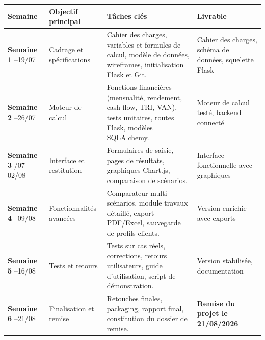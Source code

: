 \documentclass[11pt,a4paper]{article}
\begin{document}
	\begin{table}[H]
		\centering
		\footnotesize
		\renewcommand{\arraystretch}{1.45}
		\begin{tabular}{|>{\centering\arraybackslash}p{2.1cm}|>{\raggedright\arraybackslash}p{3.0cm}|>{\raggedright\arraybackslash}p{5.5cm}|>{\raggedright\arraybackslash}p{4.2cm}|}
			\hline
			\rowcolor{eccblue!15}
			\textbf{\color{eccblue}Semaine} & \textbf{\color{eccblue}Objectif principal} & \textbf{\color{eccblue}Tâches clés} & \textbf{\color{eccblue}Livrable} \\
			\hline
			\rowcolor{white}
			\textbf{Semaine 1} \newline 13--19/07 & Cadrage et spécifications & Cahier des charges, variables et formules de calcul, modèle de données, wireframes, initialisation Flask et Git. & Cahier des charges, schéma de données, squelette Flask \\ 
			\hline
			\rowcolor{gray!8}
			\textbf{Semaine 2} \newline 20--26/07 & Moteur de calcul & Fonctions financières (mensualité, rendement, cash-flow, TRI, VAN), tests unitaires, routes Flask, modèles SQLAlchemy. & Moteur de calcul testé, backend connecté \\ 
			\hline
			\rowcolor{white}
			\textbf{Semaine 3} \newline 27/07--02/08 & Interface et restitution & Formulaires de saisie, pages de résultats, graphiques Chart.js, comparaison de scénarios. & Interface fonctionnelle avec graphiques \\ 
			\hline
			\rowcolor{gray!8}
			\textbf{Semaine 4} \newline 03--09/08 & Fonctionnalités avancées & Comparateur multi-scénarios, module travaux détaillé, export PDF/Excel, sauvegarde de profils clients. & Version enrichie avec exports \\ 
			\hline
			\rowcolor{white}
			\textbf{Semaine 5} \newline 10--16/08 & Tests et retours & Tests sur cas réels, corrections, retours utilisateurs, guide d'utilisation, script de démonstration. & Version stabilisée, documentation \\ 
			\hline
			\rowcolor{gray!8}
			\textbf{Semaine 6} \newline 17--21/08 & Finalisation et remise & Retouches finales, packaging, rapport final, constitution du dossier de remise. & \textbf{Remise du projet le 21/08/2026} \\
			\hline
		\end{tabular}
	\end{table}
	
\end{document}
